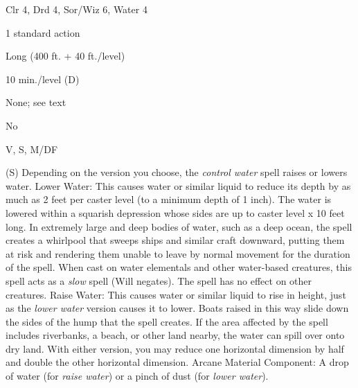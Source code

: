 
\begin{description*}
\item[Level:] Clr 4, Drd 4, Sor/Wiz 6, Water 4
\item[Casting Time:] 1 standard action
\item[Range:] Long (400 ft. + 40 ft./level)
\item[Duration:] 10 min./level (D)
\item[Saving Throw:] None; see text
\item[Spell Resistance:] No
\item[Components:] V, S, M/DF
\end{description*}

(S)
Depending on the version you choose, the \textit{control water} spell raises or
lowers water.
Lower Water: This causes water or similar liquid to reduce its depth by
as much as 2 feet per caster level (to a minimum depth of 1 inch). The water is
lowered within a squarish depression whose sides are up to caster level x 10 feet
long. In extremely large and deep bodies of water, such as a deep ocean, the spell
creates a whirlpool that sweeps ships and similar craft downward, putting them
at risk and rendering them unable to leave by normal movement for the duration
of the spell. When cast on water elementals and other water-based creatures, this
spell acts as a \textit{slow} spell (Will negates). The spell has no effect on
other creatures.
Raise Water: This causes water or similar liquid to rise in height, just
as the \textit{lower water} version causes it to lower. Boats raised in this way
slide down the sides of the hump that the spell creates. If the area affected by
the spell includes riverbanks, a beach, or other land nearby, the water can spill
over onto dry land.
With either version, you may reduce one horizontal dimension by half and double
the other horizontal dimension.
Arcane Material Component: A drop of water (for \textit{raise water})
or a pinch of dust (for \textit{lower water}).